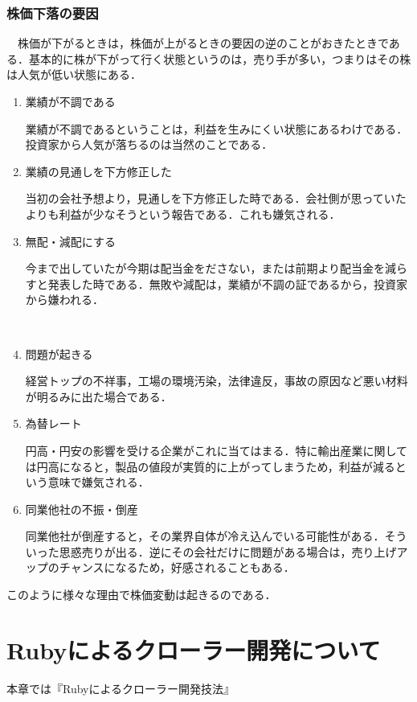 \subsection{株価下落の要因}
　株価が下がるときは，株価が上がるときの要因の逆のことがおきたときである．基本的に株が下がって行く状態というのは，売り手が多い，つまりはその株は人気が低い状態にある．

\begin{enumerate}
  \item 業績が不調である

業績が不調であるということは，利益を生みにくい状態にあるわけである．投資家から人気が落ちるのは当然のことである．



  \item 業績の見通しを下方修正した

当初の会社予想より，見通しを下方修正した時である．会社側が思っていたよりも利益が少なそうという報告である．これも嫌気される．
　
  \item 無配・減配にする

今まで出していたが今期は配当金をださない，または前期より配当金を減らすと発表した時である．無敗や減配は，業績が不調の証であるから，投資家から嫌われる．

　
  \item 問題が起きる

経営トップの不祥事，工場の環境汚染，法律違反，事故の原因など悪い材料が明るみに出た場合である．
　
  \item 為替レート

円高・円安の影響を受ける企業がこれに当てはまる．特に輸出産業に関しては円高になると，製品の値段が実質的に上がってしまうため，利益が減るという意味で嫌気される．

  \item 同業他社の不振・倒産

同業他社が倒産すると，その業界自体が冷え込んでいる可能性がある．そういった思惑売りが出る．逆にその会社だけに問題がある場合は，売り上げアップのチャンスになるため，好感されることもある\cite{kabudown}．
\end{enumerate}

このように様々な理由で株価変動は起きるのである．







\chapter{Rubyによるクローラー開発について}
本章では『Rubyによるクローラー開発技法』

